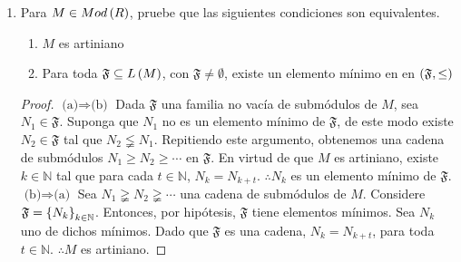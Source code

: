 \documentclass{article}
\begin{document}
\begin{enumerate}[label=\textbf{Ej \arabic*.}]
\begin{proof}
\begin{align*}
	\genmod{j_1,\dotsc,j_k}{R}\leq J_t\lneq J =\genmod{j_1,\dotsc,j_k}{R},
\end{align*}
 lo cual es absurdo ($J_t$ es un submódulo estricto de $J$ pues $\arbtfam{J}{n}{\mathbb{N}}$ es una cadena estrictamente ascendente) y por lo tanto $J$ no es finitamente generado.\\
 Sea $\arbtfam{A}{n}{\mathbb{N}}$ una cadena ascendente de submódulos. Luego $\varnothing\neq\arbtfam{A}{n}{\mathbb{N}}\subseteq\genlin{M}$ y por lo tanto $\lrprth{\arbtfam{A}{n}{\mathbb{N}},\leq}$ posee al menos un elemento maximal. De modo que $\exists\ k\in\mathbb{N}$ tal que $A_k$ es maximal en $\lrprth{\arbtfam{A}{n}{\mathbb{N}},\leq}$. Si $\forall\ l>k$ $A_l=A_k$ se tiene lo deseado. Supongamos que $\exists\ l>k$ tal que $A_k\lneq A_l$, por ser maximal, se tiene que $A_l=M$ y por lo tanto $A_r=M$, $\forall\ r\geq l$. Así, en cualquier caso, se tiene que la cadena se estabiliza y por lo tanto $M$ es noetheriano.\\
\end{proof}
\item %
Para $M \in Mod\left(R\right)$, pruebe que las siguientes condiciones son equivalentes.
\begin{enumerate}
	\item $M$ es artiniano
	\item Para toda $\mathfrak{F}\subseteq L\left(M\right)$, con $\mathfrak{F}\neq\emptyset$, existe un elemento mínimo en en $\left(\mathfrak{F},\leq\right)$
\end{enumerate}
\begin{proof}
	$\boxed{\text{(a)}\Rightarrow\text{(b)}}$ Dada $\mathfrak{F}$ una familia no vacía de submódulos de $M$, sea $N_{1}\in\mathfrak{F}$. Suponga que $N_{1}$ no es un elemento mínimo de $\mathfrak{F}$, de este modo existe $N_{2}\in\mathfrak{F}$ tal que $N_{2} \lneqq N_{1}$. Repitiendo este argumento, obtenemos una cadena de submódulos $N_{1} \geq N_{2} \geq \cdots$ en $\mathfrak{F}$. En virtud de que $M$ es artiniano, existe $k\in\mathbb{N}$ tal que para cada $t\in\mathbb{N}$, $N_{k}=N_{k+t}$. $\therefore N_{k}$ es un elemento mínimo de $\mathfrak{F}$.\\
	
	$\boxed{\text{(b)}\Rightarrow\text{(a)}}$ Sea $N_{1} \gneqq N_{2} \gneqq \cdots$ una cadena de submódulos de $M$. Considere $\mathfrak{F}={\left\{{N}_{k}\right\}}_{k\in \mathbb{N}}$. Entonces, por hipótesis, $\mathfrak{F}$ tiene elementos mínimos. Sea $N_{k}$ uno de dichos mínimos. Dado que $\mathfrak{F}$ es una cadena, $N_{k}=N_{k+t}$, para toda $t\in\mathbb{N}$. $\therefore M$ es artiniano.
\end{proof}


\end{enumerate}
\end{document}
